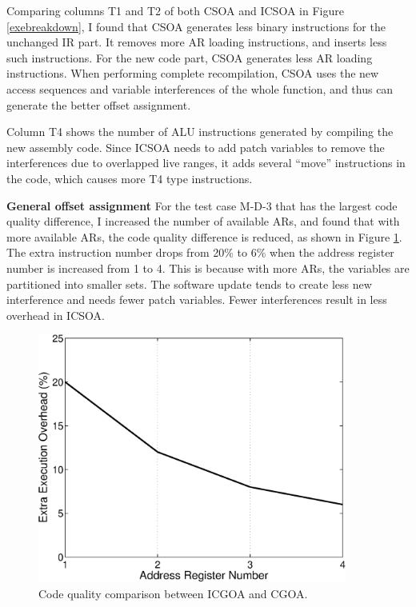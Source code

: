 Comparing columns T1 and T2 of both CSOA and ICSOA in Figure \ref{exebreakdown}, I found that CSOA generates less binary instructions for the unchanged IR part. It removes more AR loading instructions, and inserts less such instructions. For the new code part, CSOA generates less AR loading instructions. When performing complete recompilation, CSOA uses the new access sequences and variable interferences of the whole function, and thus can generate the better offset assignment.

Column T4 shows the number of ALU instructions generated by compiling the new assembly code.  Since ICSOA needs to add patch variables to remove the interferences due to overlapped live ranges, it adds several ``move'' instructions in the code, which causes more T4 type instructions.

\textbf{General offset assignment} For the test case M-D-3 that has the largest code quality difference, I increased the number of available ARs, and found that with more available ARs, the code quality difference is reduced, as shown in Figure \ref{exe_ar}. The extra instruction number drops from 20\% to 6\% when the address register number is increased from 1 to 4. 
This is because with more ARs, the variables are partitioned into smaller sets. The software update tends to create less new interference and needs fewer patch variables. Fewer interferences result in less overhead in ICSOA. 

\begin{figure}[htbp]
\begin{center}
\includegraphics[width=4in]{./figures/exe_ar.eps}
\caption{Code quality comparison between ICGOA and CGOA.}
\label{exe_ar}
\end{center}
\vspace{-0.2in}
\end{figure}

